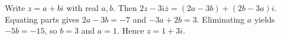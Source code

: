 Write $z=a+bi$ with real $a,b$. Then $2z-3i\overline z=(2a-3b)+(2b-3a)i$. Equating parts gives $2a-3b=-7$ and $-3a+2b=3$. Eliminating $a$ yields $-5b=-15$, so $b=3$ and $a=1$. Hence $\boxed{z=1+3i}$.
